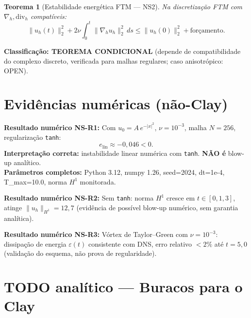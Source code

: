 \documentclass[12pt,a4paper]{article}
\newtheorem{theorem}{Teorema}
\theoremstyle{definition}
\begin{document}
\begin{boxproved}
\begin{theorem}[Estabilidade energética FTM --- NS2]
Na discretização FTM com $\nabla_h, \mathrm{div}_h$ compatíveis:
\[
  \|u_h(t)\|_2^2 + 2\nu \int_0^t \|\nabla_h u_h\|_2^2\,ds
  \le \|u_h(0)\|_2^2 + \text{forçamento}.
\]
\end{theorem}
\textbf{Classificação: TEOREMA CONDICIONAL}
(depende de compatibilidade do complexo discreto, verificada para
malhas regulares; caso anisotrópico: OPEN).
\end{boxproved}

\section{Evidências numéricas (não-Clay)}\label{sec:numericas}

\begin{boxnumerical}
\textbf{Resultado numérico NS-R1:}
Com $u_0 = A\,e^{-|x|^2}$, $\nu = 10^{-3}$, malha $N=256$,
regularização \texttt{tanh}:
\[
  e_{\mathrm{lin}} \approx -0{,}046 < 0.
\]
\textbf{Interpretação correta:} instabilidade linear numérica com
\texttt{tanh}. \textbf{NÃO é} blow-up analítico.\\
\textbf{Parâmetros completos:} Python 3.12, numpy 1.26, seed=2024,
dt=1e-4, T\_max=10.0, norma $H^1$ monitorada.
\end{boxnumerical}

\begin{boxnumerical}
\textbf{Resultado numérico NS-R2:}
Sem \texttt{tanh}: norma $H^1$ cresce em $t \in [0, 1{,}3]$,
atinge $\|u_h\|_{H^1} = 12{,}7$ (evidência de possível blow-up
numérico, sem garantia analítica).
\end{boxnumerical}

\begin{boxnumerical}
\textbf{Resultado numérico NS-R3:}
Vórtex de Taylor--Green com $\nu = 10^{-3}$: dissipação de energia
$\varepsilon(t)$ consistente com DNS, erro relativo $< 2\%$ até
$t = 5{,}0$ (validação do esquema, não prova de regularidade).
\end{boxnumerical}

\section{TODO analítico --- Buracos para o Clay}\label{sec:todo}
\end{document}
